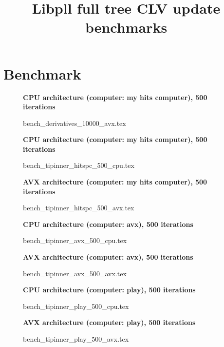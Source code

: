 \documentclass[a4paper]{article}
\begin{document}
\newcommand*{\figuretitle}[1]{%
    {\centering%
    \textbf{#1}%
    \par\medskip}%
}


\title{Libpll full tree CLV update benchmarks}
\maketitle



\section{Benchmark}


\begin{figure}[!htb]
\figuretitle{CPU architecture (computer: my hits computer), 500 iterations}
{bench_derivatives_10000_avx.tex}
\end{figure}


\begin{figure}[!htb]
\figuretitle{CPU architecture (computer: my hits computer), 500 iterations}
{bench_tipinner_hitspc_500_cpu.tex}
\end{figure}

\begin{figure}[!htb]
\figuretitle{AVX architecture (computer: my hits computer), 500 iterations}
{bench_tipinner_hitspc_500_avx.tex}
\end{figure}

\begin{figure}[!htb]
\figuretitle{CPU architecture (computer: avx), 500 iterations}
{bench_tipinner_avx_500_cpu.tex}
\end{figure}

\begin{figure}[!htb]
\figuretitle{AVX architecture (computer: avx), 500 iterations}
{bench_tipinner_avx_500_avx.tex}
\end{figure}

\begin{figure}[!htb]
\figuretitle{CPU architecture (computer: play), 500 iterations}
{bench_tipinner_play_500_cpu.tex}
\end{figure}

\begin{figure}[!htb]
\figuretitle{AVX architecture (computer: play), 500 iterations}
{bench_tipinner_play_500_avx.tex}
\end{figure}
\end{document}
